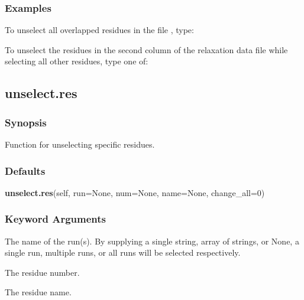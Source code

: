   
 \subsubsection{Examples} 

 To unselect all overlapped residues in the file , type: 
  



 To unselect the residues in the second column of the relaxation data file  while selecting all other residues, type one of:  
  



  

 \newpage 

 \subsection{unselect.res} 

  
 \subsubsection{Synopsis} 

 Function for unselecting specific residues. 
  

  
 \subsubsection{Defaults} 

 \textsf{\textbf{unselect.res}(self, run=None, num=None, name=None, change\_all=0)} 

  
 \subsubsection{Keyword Arguments} 

   The name of the run(s).  By supplying a single string, array of strings, or None, a single run, multiple runs, or all runs will be selected respectively.   

   The residue number.   

   The residue name.   

